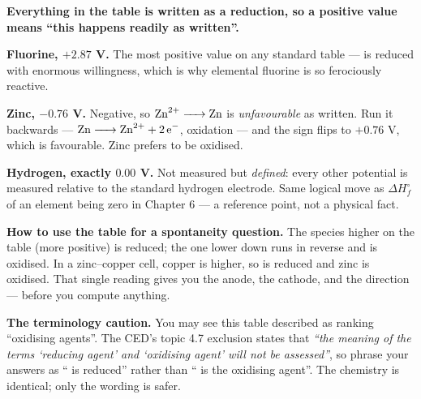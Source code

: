 \documentclass{apchem-worksheet}
\begin{document}
\begin{workedexample}
\textbf{Everything in the table is written as a reduction, so a
positive value means ``this happens readily as written''.}

\textbf{Fluorine, $+2.87$ V.} The most positive value on any standard
table ---  is reduced with enormous willingness, which is why
elemental fluorine is so ferociously reactive.

\textbf{Zinc, $-0.76$ V.} Negative, so $\ce{Zn^2+ -> Zn}$ is
\emph{unfavourable} as written. Run it backwards ---
$\ce{Zn -> Zn^2+ + 2e-}$, oxidation --- and the sign flips to $+0.76$ V,
which is favourable. Zinc prefers to be oxidised.

\textbf{Hydrogen, exactly $0.00$ V.} Not measured but \emph{defined}:
every other potential is measured relative to the standard hydrogen
electrode. Same logical move as $\Delta H_{f}^{\circ}$ of an element
being zero in Chapter 6 --- a reference point, not a physical fact.

\textbf{How to use the table for a spontaneity question.} The species
higher on the table (more positive) is reduced; the one lower down runs
in reverse and is oxidised. In a zinc--copper cell, copper is higher, so
 is reduced and zinc is oxidised. That single reading gives
you the anode, the cathode, and the direction --- before you compute
anything.

\textbf{The terminology caution.} You may see this table described as
ranking ``oxidising agents''. The CED's topic 4.7 exclusion states that
\emph{``the meaning of the terms `reducing agent' and `oxidising agent'
will not be assessed''}, so phrase your answers as `` is
reduced'' rather than `` is the oxidising agent''. The
chemistry is identical; only the wording is safer.
\end{workedexample}
\end{document}
